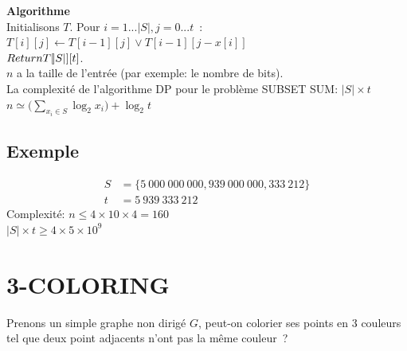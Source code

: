 \documentclass[a4paper,12pt]{article}
\begin{document}
  \textbf{Algorithme}\\
    Initialisons $T$. Pour $i = 1 ... |S|, j = 0 ... t$~:\\
    $T[i][j] \leftarrow T[i-1][j] \vee T[i-1][j-x[i]]$\\
    $Return T[\abs S][t]$.\\
    $n$ a la taille de l'entrée (par exemple: le nombre de bits).\\
    La complexité de l'algorithme DP pour le problème SUBSET SUM: $|S| \times t$\\

    $n \simeq \big( \sum\limits_{x_i \in S} \log_2 x_i \big) + \log_2 t$\\

    \subsection{Exemple}
      \begin{align*}
	S &= \{5\ 000\ 000\ 000, 939\ 000\ 000, 333\ 212\}\\
	t &= 5\ 939\ 333\ 212
      \end{align*}
      Complexité: $n \leq 4 \times 10 \times 4 = 160$\\
      $|S| \times t \geq 4 \times 5 \times 10^9$


\section{3-COLORING}
  Prenons un simple graphe non dirigé $G$, peut-on colorier ses points en 3 couleurs tel que deux point adjacents n'ont pas la même couleur~?

  \begin{center}
    \end{center}
\end{document}
